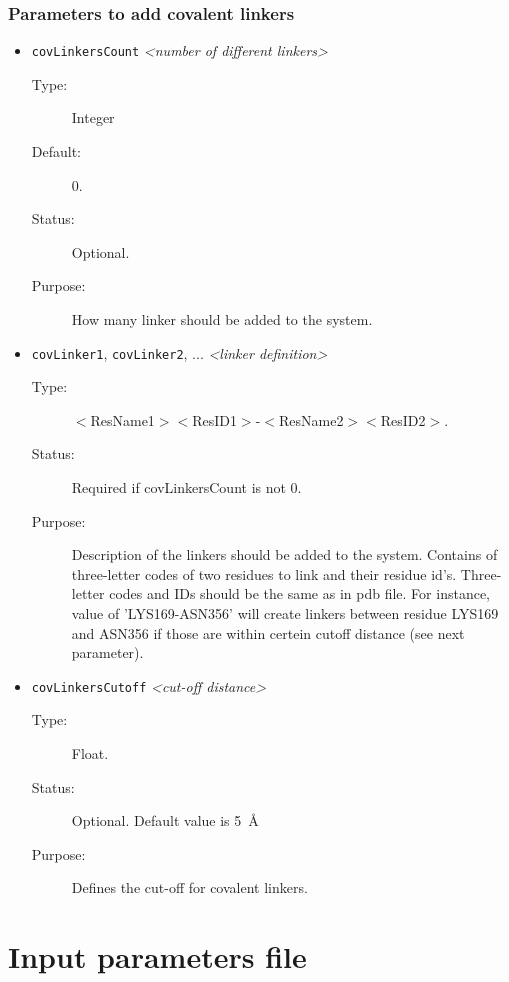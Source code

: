\documentclass[a4paper]{article}
\begin{document}
\subsubsection{Parameters to add covalent linkers}
\begin{itemize}

\item \texttt{covLinkersCount} \textit{\textless number of different linkers\textgreater}
\begin{description}
\item[Type:] Integer
\item[Default:] 0.
\item[Status:] Optional.
\item[Purpose:] How many linker should be added to the system.
\end{description}

\item \texttt{covLinker1}, \texttt{covLinker2}, ... \textit{\textless linker definition\textgreater}
\begin{description}
\item[Type:] $<$ResName1$><$ResID1$>$-$<$ResName2$><$ResID2$>$.
\item[Status:] Required if covLinkersCount is not 0.
\item[Purpose:] Description of the linkers should be added to the system. Contains of three-letter codes of two residues to link and their residue id's. Three-letter codes and IDs should be the same as in pdb file. For instance, value of 'LYS169-ASN356' will create linkers between residue LYS169 and ASN356 if those are within certein cutoff distance (see next parameter).
\end{description}

\item \texttt{covLinkersCutoff} \textit{\textless cut-off distance\textgreater}
\begin{description}
\item[Type:] Float.
\item[Status:] Optional. Default value is 5~\AA
\item[Purpose:] Defines the cut-off for covalent linkers.
\end{description}

\end{itemize}

\section{Input parameters file}
\end{document}
